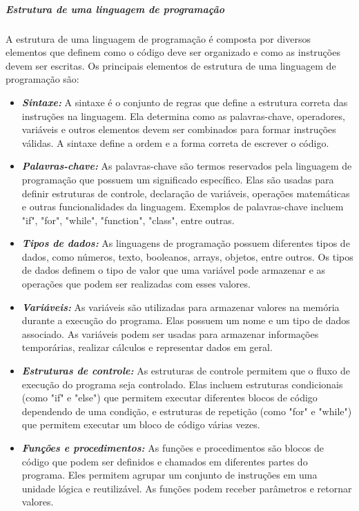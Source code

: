 \documentclass[a4paper, 12pt, onecolumn,singlespacing]{article}
\begin{document}
	\subparagraph{Estrutura de uma linguagem de programação} A estrutura de uma linguagem de programação é composta por diversos elementos que definem como o código deve ser organizado e como as instruções devem ser escritas. Os principais elementos de estrutura de uma linguagem de programação são:
	
	\begin{itemize}
		\item \textbf{\textit{Sintaxe:}} A sintaxe é o conjunto de regras que define a estrutura correta das instruções na linguagem. Ela determina como as palavras-chave, operadores, variáveis e outros elementos devem ser combinados para formar instruções válidas. A sintaxe define a ordem e a forma correta de escrever o código.
		
		\item \textbf{\textit{Palavras-chave:}} As palavras-chave são termos reservados pela linguagem de programação que possuem um significado específico. Elas são usadas para definir estruturas de controle, declaração de variáveis, operações matemáticas e outras funcionalidades da linguagem. Exemplos de palavras-chave incluem "if", "for", "while", "function", "class", entre outras.
		
		\item \textbf{\textit{Tipos de dados:}} As linguagens de programação possuem diferentes tipos de dados, como números, texto, booleanos, arrays, objetos, entre outros. Os tipos de dados definem o tipo de valor que uma variável pode armazenar e as operações que podem ser realizadas com esses valores.
		
		\item \textbf{\textit{Variáveis:}} As variáveis são utilizadas para armazenar valores na memória durante a execução do programa. Elas possuem um nome e um tipo de dados associado. As variáveis podem ser usadas para armazenar informações temporárias, realizar cálculos e representar dados em geral.
		
		\item \textbf{\textit{Estruturas de controle:}} As estruturas de controle permitem que o fluxo de execução do programa seja controlado. Elas incluem estruturas condicionais (como "if" e "else") que permitem executar diferentes blocos de código dependendo de uma condição, e estruturas de repetição (como "for" e "while") que permitem executar um bloco de código várias vezes.
		
		\item \textbf{\textit{Funções e procedimentos:}} As funções e procedimentos são blocos de código que podem ser definidos e chamados em diferentes partes do programa. Eles permitem agrupar um conjunto de instruções em uma unidade lógica e reutilizável. As funções podem receber parâmetros e retornar valores.
		

\end{itemize}
\end{document}
